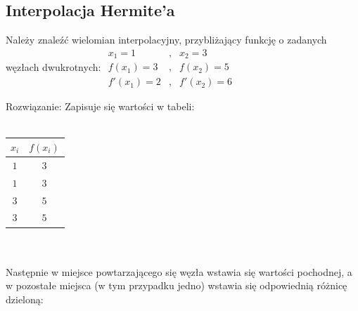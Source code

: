 \documentclass[12pt]{article}
\begin{document}
    \subsection{Interpolacja Hermite’a}
    \begin{exercise}
        Należy znaleźć wielomian interpolacyjny, przybliżający funkcję o zadanych węzłach dwukrotnych:
        ${\begin{array}{lcl}
              x_{1}=1&,&x_{2}=3\\f(x_{1})=3&,&f(x_{2})=5\\f'(x_{1})=2&,&f'(x_{2})=6
        \end{array}}$
    \end{exercise}

    Rozwiązanie:
    Zapisuje się wartości w tabeli:\\\\
    \begin{tabular}{|c|c|}
        \hline
        $x_i$ & $f(x_i)$ \\ \hline
        $1$ & $3$ \\ \hline
        $1$ & $3$ \\ \hline
        $3$ & $5$ \\ \hline
        $3$ & $5$ \\ \hline
    \end{tabular}\\\\
    Następnie w miejsce powtarzającego się węzła wstawia się wartości pochodnej, a w pozostałe miejsca (w tym przypadku jedno) wstawia się odpowiednią różnicę dzieloną:\\\\
\end{document}

